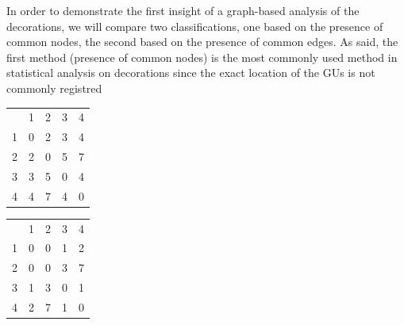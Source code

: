 \documentclass[article]{jss}\usepackage[]{graphicx}\usepackage[]{color}
\begin{document}
In order to demonstrate the first insight of a graph-based analysis of the decorations, we will compare two classifications, one based on the presence of common nodes, the second based on the presence of common edges. As said, the first method (presence of common nodes) is the most commonly used method in statistical analysis on decorations since the exact location of the GUs is not commonly registred

\begin{table}[htb]
\begin{minipage}{.45\textwidth}
\centering
\begin{tabular}{rrrrr}
  & 1 & 2 & 3 & 4 \\ 
 1 & 0 & 2 & 3 & 4 \\ 
  2 & 2 & 0 & 5 & 7 \\ 
  3 & 3 & 5 & 0 & 4 \\ 
  4 & 4 & 7 & 4 & 0 \\ 
  \end{tabular}

\end{minipage}
\begin{minipage}{.45\textwidth}
\centering
\begin{tabular}{rrrrr}
  & 1 & 2 & 3 & 4 \\ 
 1 & 0 & 0 & 1 & 2 \\ 
  2 & 0 & 0 & 3 & 7 \\ 
  3 & 1 & 3 & 0 & 1 \\ 
  4 & 2 & 7 & 1 & 0 \\ 
  \end{tabular}

\end{minipage}
\end{table}
\end{document}

